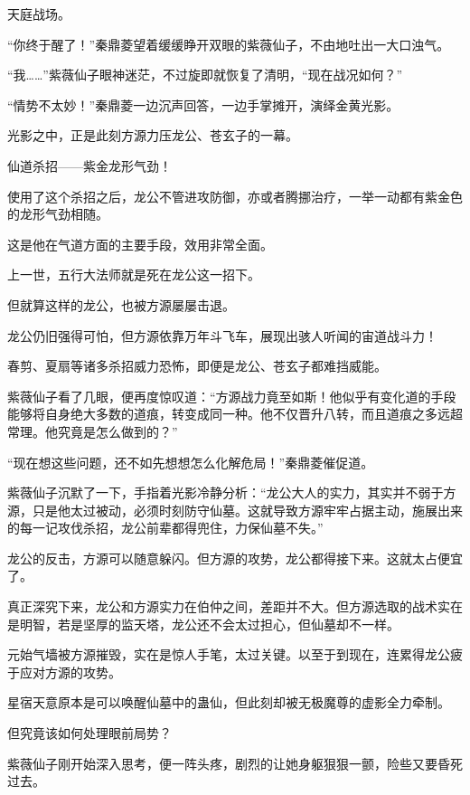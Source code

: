 
\begin{this_body}



天庭战场。

“你终于醒了！”秦鼎菱望着缓缓睁开双眼的紫薇仙子，不由地吐出一大口浊气。

“我……”紫薇仙子眼神迷茫，不过旋即就恢复了清明，“现在战况如何？”

“情势不太妙！”秦鼎菱一边沉声回答，一边手掌摊开，演绎金黄光影。

光影之中，正是此刻方源力压龙公、苍玄子的一幕。

仙道杀招——紫金龙形气劲！

使用了这个杀招之后，龙公不管进攻防御，亦或者腾挪治疗，一举一动都有紫金色的龙形气劲相随。

这是他在气道方面的主要手段，效用非常全面。

上一世，五行大法师就是死在龙公这一招下。

但就算这样的龙公，也被方源屡屡击退。

龙公仍旧强得可怕，但方源依靠万年斗飞车，展现出骇人听闻的宙道战斗力！

春剪、夏扇等诸多杀招威力恐怖，即便是龙公、苍玄子都难挡威能。

紫薇仙子看了几眼，便再度惊叹道：“方源战力竟至如斯！他似乎有变化道的手段能够将自身绝大多数的道痕，转变成同一种。他不仅晋升八转，而且道痕之多远超常理。他究竟是怎么做到的？”

“现在想这些问题，还不如先想想怎么化解危局！”秦鼎菱催促道。

紫薇仙子沉默了一下，手指着光影冷静分析：“龙公大人的实力，其实并不弱于方源，只是他太过被动，必须时刻防守仙墓。这就导致方源牢牢占据主动，施展出来的每一记攻伐杀招，龙公前辈都得兜住，力保仙墓不失。”

龙公的反击，方源可以随意躲闪。但方源的攻势，龙公都得接下来。这就太占便宜了。

真正深究下来，龙公和方源实力在伯仲之间，差距并不大。但方源选取的战术实在是明智，若是坚厚的监天塔，龙公还不会太过担心，但仙墓却不一样。

元始气墙被方源摧毁，实在是惊人手笔，太过关键。以至于到现在，连累得龙公疲于应对方源的攻势。

星宿天意原本是可以唤醒仙墓中的蛊仙，但此刻却被无极魔尊的虚影全力牵制。

但究竟该如何处理眼前局势？

紫薇仙子刚开始深入思考，便一阵头疼，剧烈的让她身躯狠狠一颤，险些又要昏死过去。


\end{this_body}
